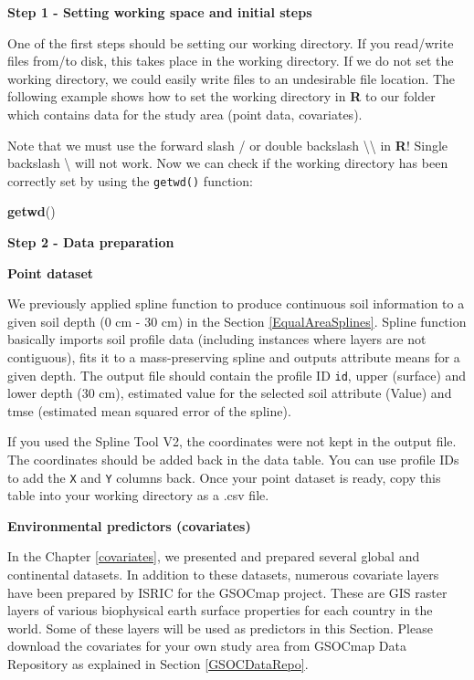 \documentclass[10pt,b5paper,]{book}
\newenvironment{Shaded}{\begin{snugshade}}{\end{snugshade}}
\newcommand{\KeywordTok}[1]{\textcolor[rgb]{0.13,0.29,0.53}{\textbf{#1}}}
\newcommand{\NormalTok}[1]{#1}
\theoremstyle{definition}
\theoremstyle{definition}
\theoremstyle{definition}
\theoremstyle{remark}
\begin{document}
\textbf{Step 1 - Setting working space and initial steps}

One of the first steps should be setting our working directory. If you
read/write files from/to disk, this takes place in the working
directory. If we do not set the working directory, we could easily write
files to an undesirable file location. The following example shows how
to set the working directory in \textbf{R} to our folder which contains
data for the study area (point data, covariates).

Note that we must use the forward slash / or double backslash
\textbackslash{}\textbackslash{} in \textbf{R}! Single backslash
\textbackslash{} will not work. Now we can check if the working
directory has been correctly set by using the \texttt{getwd()} function:

\begin{Shaded}
\begin{Highlighting}[]
\KeywordTok{getwd}\NormalTok{()}
\end{Highlighting}
\end{Shaded}

\textbf{Step 2 - Data preparation}

\textbf{Point dataset}

We previously applied spline function to produce continuous soil
information to a given soil depth (0 cm - 30 cm) in the Section
\ref{EqualAreaSplines}. Spline function basically imports soil profile
data (including instances where layers are not contiguous), fits it to a
mass-preserving spline and outputs attribute means for a given depth.
The output file should contain the profile ID \texttt{id}, upper
(surface) and lower depth (30 cm), estimated value for the selected soil
attribute (Value) and tmse (estimated mean squared error of the spline).

If you used the Spline Tool V2, the coordinates were not kept in the
output file. The coordinates should be added back in the data table. You
can use profile IDs to add the \texttt{X} and \texttt{Y} columns back.
Once your point dataset is ready, copy this table into your working
directory as a .csv file.

\textbf{Environmental predictors (covariates)}

In the Chapter \ref{covariates}, we presented and prepared several
global and continental datasets. In addition to these datasets, numerous
covariate layers have been prepared by ISRIC for the GSOCmap project.
These are GIS raster layers of various biophysical earth surface
properties for each country in the world. Some of these layers will be
used as predictors in this Section. Please download the covariates for
your own study area from GSOCmap Data Repository as explained in Section
\ref{GSOCDataRepo}.
\end{document}
